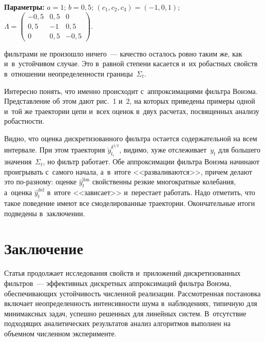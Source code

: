 \begin{multicols}{2}
\begin{center}
\smallskip

\parbox{78mm}{\footnotesize{\hspace*{5mm}\textbf{Параметры:} $a=1$; $b=0{,}5$; $(c_1, c_2, c_3)= (-1, 0, 1)$; $\Lambda= 
\begin{pmatrix}
-0{,}5 & 0{,}5 &0\\
0{,}5 &-1& 0{,}5\\
0 & 0{,}5& -0{,}5
\end{pmatrix}$.
}}

\end{center}


\noindent
 фильт\-ра\-ми не произошло 
ничего~--- качество осталось ров\-но таким же, как и~в~устойчивом случае. 
Это в~равной степени касается и~их робастных свойств в~отношении 
неопределенности границы~$\Sigma_t$.



     
     

    
    

  
      Интересно понять, что именно происходит с~аппроксимациями 
фильт\-ра Вонэма. Пред\-став\-ле\-ние об этом дают рис.~1 и~2, на 
которых приведены примеры одной и~той же траектории цепи и~всех 
оценок в~двух расчетах, по\-свя\-щен\-ных анализу ро\-баст\-ности.
{

}
      
      
      
      Видно, что оценка дискретизованного фильт\-ра остается 
содержательной на всем интервале. При этом траектория 
$\breve{y}_{t_i}^{\delta^{1/2}}$, видимо, хуже отслеживает~$y_t$ 
для большего значения~$\Sigma_t$, но фильтр работает. Обе аппроксимации 
фильт\-ра Вонэма начинают проигрывать с~самого начала, а~в~итоге 
<<разваливаются>>, причем делают это по-раз\-но\-му: оценке 
$\hat{y}_t^{\mathrm{lim}}$ свойственны резкие многократные колебания, а~оценка 
$\hat{y}_t^{\mathrm{del}}$ в~итоге <<зависает>> и~перестает работать. Надо отметить, 
что такое поведение имеют все смоделированные траектории. 
Окончательные итоги подведены в~за\-клю\-че\-нии.



\section{Заключение}
      
      Статья продолжает исследования свойств и~приложений 
дискретизованных фильт\-ров~--- эффективных дискретных аппроксимаций 
фильтра Вонэма, обес\-пе\-чи\-ва\-ющих устой\-чи\-вость чис\-лен\-ной реализации. 
Рас\-смот\-рен\-ная по\-ста\-нов\-ка включает не\-опре\-де\-лен\-ность ин\-тен\-сив\-ности шума в~наблюдениях,\linebreak
 типичную для минимаксных задач, 
успешно решенных для линейных сис\-тем. В~отсутствие подходящих аналитических результатов 
анализ алгоритмов выполнен на объемном чис\-лен\-ном \mbox{эксперименте}. 


\end{multicols}
